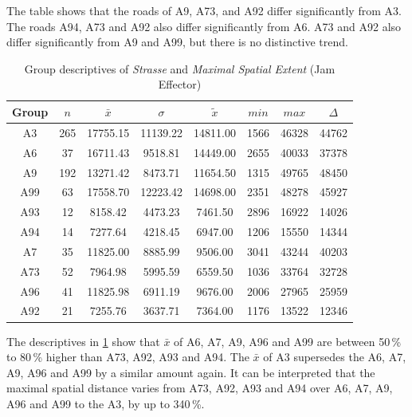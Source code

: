 The table shows that the roads of A9, A73, and A92 differ significantly from A3. The roads A94, A73 and A92 also differ significantly from A6. A73 and A92 also differ significantly from A9 and A99, but there is no distinctive trend.
\begin{table}[ht!]
	\tiny
	\centering
	\begin{tabular}{c|c|c|c|c|c|c|c}
		\toprule
		Group & $n$ & $\bar{x}$ & $\sigma$ & $\tilde{x}$ & $min$ & $max$ & $\Delta$ \\
		\midrule
		A3   & 265 & 17755.15 & 11139.22 & 14811.00 & 1566 & 46328 & 44762 \\ 
		A6   & 37  & 16711.43 & 9518.81  & 14449.00 & 2655 & 40033 & 37378 \\ 
		A9   & 192 & 13271.42 & 8473.71  & 11654.50 & 1315 & 49765 & 48450 \\ 
		A99  & 63  & 17558.70 & 12223.42 & 14698.00 & 2351 & 48278 & 45927 \\ 
		A93  & 12  & 8158.42  & 4473.23  & 7461.50  & 2896 & 16922 & 14026 \\ 
		A94  & 14  & 7277.64  & 4218.45  & 6947.00  & 1206 & 15550 & 14344 \\ 
		A7   & 35  & 11825.00 & 8885.99  & 9506.00  & 3041 & 43244 & 40203 \\ 
		A73  & 52  & 7964.98  & 5995.59  & 6559.50  & 1036 & 33764 & 32728 \\ 
		A96  & 41  & 11825.98 & 6911.19  & 9676.00  & 2006 & 27965 & 25959 \\ 
		A92  & 21  & 7255.76  & 3637.71  & 7364.00  & 1176 & 13522 & 12346 \\ 
		\bottomrule
	  \end{tabular}
    \caption{Group descriptives of \textit{Strasse} and \textit{Maximal Spatial Extent} (Jam Effector)}
    \label{tbl:descriptives_baysis_effector_Strasse_SMax}
\end{table}
The descriptives in \cref{tbl:descriptives_baysis_effector_Strasse_SMax} show that $\bar{x}$ of A6, A7, A9, A96 and A99 are between 50\,\% to 80\,\% higher than A73, A92, A93 and A94. The $\bar{x}$ of A3 supersedes the A6, A7, A9, A96 and A99 by a similar amount again. It can be interpreted that the maximal spatial distance varies from A73, A92, A93 and A94 over A6, A7, A9, A96 and A99 to the A3, by up to 340\,\%.

